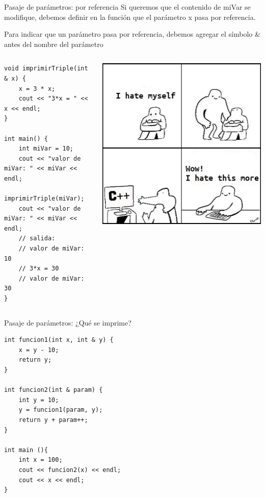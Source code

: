 \documentclass[12pt]{beamer}
\begin{document}
\begin{frame}[fragile]{Pasaje de parámetros: por referencia}
    Si queremos que el contenido de \alert{miVar} se modifique, debemos definir en la función que \alert{el parámetro x pasa por referencia}.
    
    \medskip
    
    Para indicar que un parámetro pasa por referencia, debemos agregar el símbolo \alert{\&} antes del nombre del parámetro
    \begin{columns}
        \begin{lstlisting}[basicstyle=\tiny]
void imprimirTriple(int & x) {
    x = 3 * x;
    cout << "3*x = " << x << endl;
}      

int main() {
    int miVar = 10;
    cout << "valor de miVar: " << miVar << endl;
    imprimirTriple(miVar);
    cout << "valor de miVar: " << miVar << endl;
    // salida:
    // valor de miVar: 10
    // 3*x = 30
    // valor de miVar: 30
}
\end{lstlisting}
        \includegraphics[width=\textwidth]{meme.jpg}
    \end{columns}

\end{frame}

\begin{frame}[fragile]{Pasaje de parámetros: ¿Qué se imprime?}
\begin{lstlisting}
int funcion1(int x, int & y) {
    x = y - 10;
    return y;
}

int funcion2(int & param) {
    int y = 10;
    y = funcion1(param, y);
    return y + param++;
}

int main (){
    int x = 100;
    cout << funcion2(x) << endl;
    cout << x << endl;
}

\end{lstlisting}

\end{frame}
\end{document}
